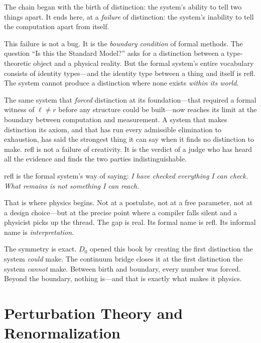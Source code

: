 \documentclass[11pt,a4paper]{book}
\def\texttt#1{#1}%
\begin{document}
The chain began with the birth of distinction: the system's ability to tell two things apart. It ends here, at a \emph{failure} of distinction: the system's inability to tell the computation apart from itself.

This failure is not a bug. It is the \emph{boundary condition} of formal methods. The question ``Is this the Standard Model?'' asks for a distinction between a type-theoretic object and a physical reality. But the formal system's entire vocabulary consists of identity types---and the identity type between a thing and itself is \texttt{refl}. The system cannot produce a distinction where none exists \emph{within its world}.

The same system that \emph{forced} distinction at its foundation---that required a formal witness of $\ell \neq r$ before any structure could be built---now reaches its limit at the boundary between computation and measurement.  A system that makes distinction its axiom, and that has run every admissible elimination to exhaustion, has said the strongest thing it can say when it finds no distinction to make.  \texttt{refl} is not a failure of creativity.  It is the verdict of a judge who has heard all the evidence and finds the two parties indistinguishable.

\texttt{refl} is the formal system's way of saying: \emph{I have checked everything I can check. What remains is not something I can reach.}

That is where physics begins. Not at a postulate, not at a free parameter, not at a design choice---but at the precise point where a compiler falls silent and a physicist picks up the thread. The gap is real. Its formal name is \texttt{refl}. Its informal name is \emph{interpretation}.

The symmetry is exact. $D_0$ opened this book by creating the first distinction the system \emph{could} make. The continuum bridge closes it at the first distinction the system \emph{cannot} make. Between birth and boundary, every number was forced. Beyond the boundary, nothing is---and that is exactly what makes it physics.

\chapter{Perturbation Theory and Renormalization}
\label{ch:perturbation-rg}
\end{document}

